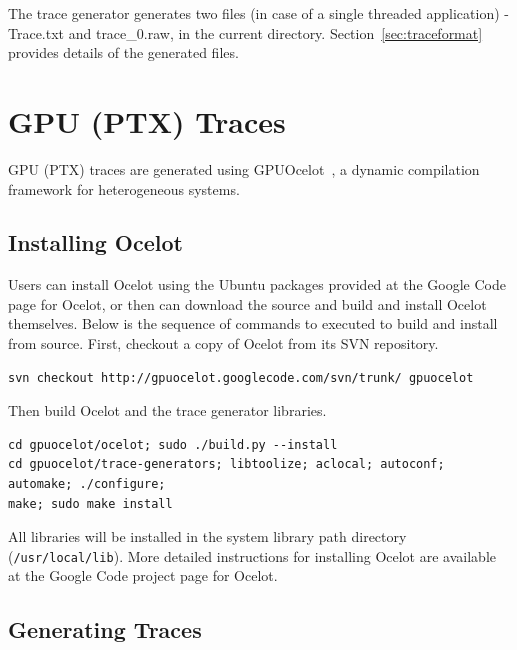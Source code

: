 The trace generator generates two files (in case of a single threaded
    application) - Trace.txt and trace\_0.raw, in the current directory.
Section~\ref{sec:traceformat} provides details of the generated files.



\section{GPU (PTX) Traces}
\label{sec:gpu_traces}

GPU (PTX) traces are generated using GPUOcelot~\cite{ocelot}, a dynamic compilation
framework for heterogeneous systems. 


\subsection{Installing Ocelot}

Users can install Ocelot using the Ubuntu packages provided at the Google Code
page for Ocelot, or then can download the source and build and install Ocelot
themselves. Below is the sequence of commands to executed to build and install
from source. First, checkout a copy of Ocelot from its SVN repository.

\begin{Verbatim}
svn checkout http://gpuocelot.googlecode.com/svn/trunk/ gpuocelot
\end{Verbatim}


Then build Ocelot and the trace generator libraries.

\begin{Verbatim}
cd gpuocelot/ocelot; sudo ./build.py --install
cd gpuocelot/trace-generators; libtoolize; aclocal; autoconf; automake; ./configure; 
make; sudo make install
\end{Verbatim}


All libraries will be installed in the system library path directory
(\Verb+/usr/local/lib+). More detailed instructions for installing
Ocelot are available at the Google Code project page for Ocelot.


\subsection{Generating Traces}

